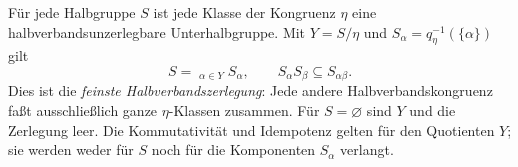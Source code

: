 \begin{theorem}
\label{b28guide:thm:tamura}
Für jede Halbgruppe $S$ ist jede Klasse der Kongruenz $\eta$
eine halbverbandsunzerlegbare Unterhalbgruppe.
Mit $Y=S/\eta$ und $S_\alpha=q_\eta^{-1}(\{\alpha\})$ gilt
\[
 S=\mathop{\dot\bigcup}_{\alpha\in Y}S_\alpha,\qquad
 S_\alpha S_\beta\subseteq S_{\alpha\beta}.
\]
Dies ist die \emph{feinste Halbverbandszerlegung}: Jede andere
Halbverbandskongruenz faßt ausschließlich ganze $\eta$-Klassen zusammen.
Für $S=\varnothing$ sind $Y$ und die Zerlegung leer.
Die Kommutativität und Idempotenz gelten für den Quotienten $Y$;
sie werden weder für $S$ noch für die Komponenten $S_\alpha$ verlangt.
\cite{bogdanovic2011}
\end{theorem}